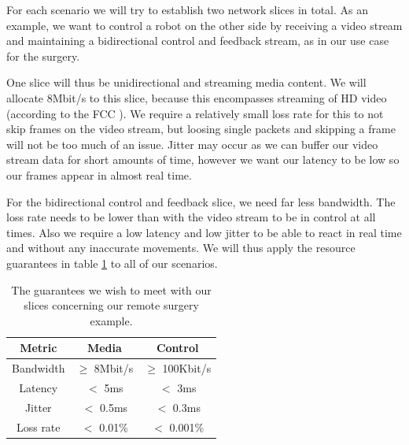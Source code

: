 
For each scenario we will try to establish two network slices in total. As an example, we want to control a robot on the other side by receiving a video stream and maintaining a bidirectional control and feedback stream, as in our use case for the surgery.

One slice will thus be unidirectional and streaming media content. We will allocate 8Mbit/s to this slice, because this encompasses streaming of HD video (according to the FCC \cite{fcc}). We require a relatively small loss rate for this to not skip frames on the video stream, but loosing single packets and skipping a frame will not be too much of an issue. Jitter may occur as we can buffer our video stream data for short amounts of time, however we want our latency to be low so our frames appear in almost real time.

For the bidirectional control and feedback slice, we need far less bandwidth. The loss rate needs to be lower than with the video stream to be in control at all times. Also we require a low latency and low jitter to be able to react in real time and without any inaccurate movements. We will thus apply the resource guarantees in table \ref{table:slices} to all of our scenarios.

\begin{table}[ht]
    \centering
    \begin{tabular}{ |c|c|c| }
    \hline
    \textbf{Metric} & \textbf{Media} & \textbf{Control} \\
    \hline
         Bandwidth & $\geq$ 8Mbit/s & $\geq$ 100Kbit/s \\
         Latency   & $<$ 5ms     & $<$ 3ms      \\
         Jitter    & $<$ 0.5ms  & $<$ 0.3ms   \\
         Loss rate & $<$ 0.01\% & $<$ 0.001\% \\
    \hline
    \end{tabular}
    \caption[Slice QoS guarantees in our remote surgery example]{The guarantees we wish to meet with our slices concerning our remote surgery example.}
    \label{table:slices}
\end{table}


